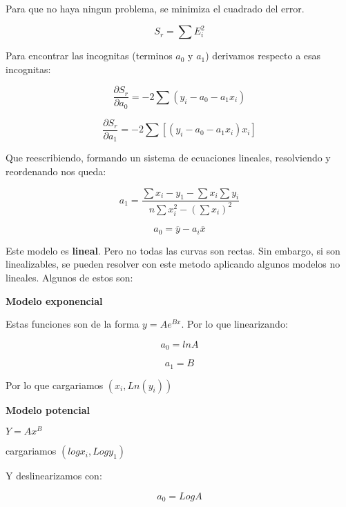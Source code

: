 \documentclass[10pt]{article}
\begin{document}
Para que no haya ningun problema, se minimiza el cuadrado del error.

\begin{equation}
	S_r = \sum E_i^2
\end{equation}

Para encontrar las incognitas (terminos $a_0$ y $a_1$) derivamos respecto a esas incognitas:

\begin{equation}
	\dfrac{\partial S_r}{\partial a_0} =-2\sum (y_i-a_0-a_1x_i)
\end{equation}

\begin{equation}
	\dfrac{\partial S_r}{\partial a_1} =-2\sum [(y_i-a_0-a_1x_i)x_i]
\end{equation}

Que reescribiendo, formando un sistema de ecuaciones lineales, resolviendo y reordenando nos queda:

\begin{equation}
	a_1 = \dfrac{\sum x_i-y_1 - \sum x_i \sum y_i}{n\sum x_i^2 - (\sum x_i)^2}
\end{equation}

\begin{equation}
	a_0 = \overline{y} - a_i \overline{x}
\end{equation}

Este modelo es \textbf{lineal}. Pero no todas las curvas son rectas. Sin embargo, si son linealizables, se pueden resolver con este metodo aplicando 
algunos modelos no lineales. Algunos de estos son:

\textbf{Modelo exponencial}

Estas funciones son de la forma $ y = Ae^{Bx}$. Por lo que linearizando:

\begin{equation}
	a_0 = ln A
\end{equation}
	
\begin{equation}
	a_1 = B
\end{equation}

Por lo que cargariamos $(x_i, Ln (y_i))$

\textbf{Modelo potencial}

$Y = Ax^B$

cargariamos $(log x_i, Log y_1)$


Y deslinearizamos con:

\begin{equation}
	a_0 = Log A
\end{equation}
\end{document}
